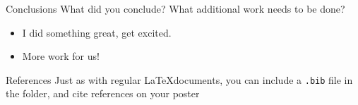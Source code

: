 \documentclass[final,t]{beamer}
\begin{document}
\begin{frame}[fragile]
\begin{columns}[t]
\begin{column}{0.32\linewidth}
       
    
    \begin{block}{Conclusions}
        What did you conclude? What additional work needs to be done?
        \vspace{20pt}
\begin{itemize}
  \item I did something great, get excited.
  \vspace{10pt}
  \item More work for us!
\end{itemize}
      \end{block}
      \begin{block}{References}
			Just as with regular \LaTeX documents, you can include a \verb+.bib+ file in the folder, and cite references on your poster
			\scriptsize
			\printbibliography[heading=none]
			\normalsize
		\end{block}
 
 
    \end{column}%

  \end{columns}

\end{frame}
\end{document}
